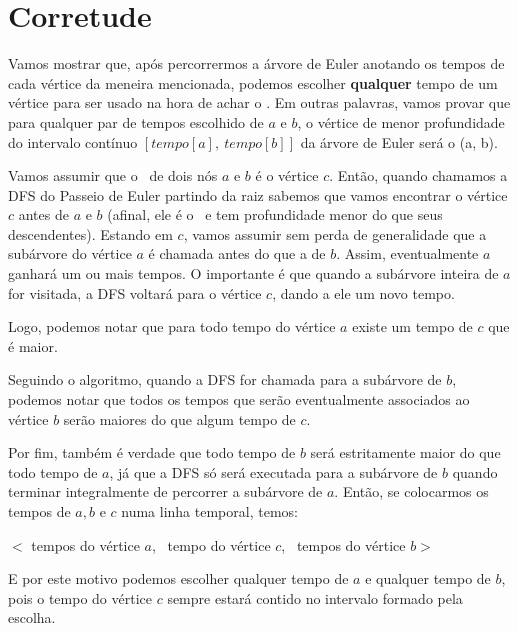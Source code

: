 \section{Corretude}

Vamos mostrar que, após percorrermos a árvore de Euler anotando os tempos de cada vértice da meneira mencionada, podemos escolher \textbf{qualquer} tempo de um vértice para ser usado na hora de achar o \LCA. Em outras palavras, vamos provar que para qualquer par de tempos escolhido de $a$ e $b$, o vértice de menor profundidade do intervalo contínuo $[tempo[a],\ tempo[b]]$ da árvore de Euler será o \LCA(a, b).

\vspace{0.5cm}

Vamos assumir que o \LCA\ de dois nós $a$ e $b$ é o vértice $c$. Então, quando chamamos a DFS do Passeio de Euler partindo da raiz sabemos que vamos encontrar o vértice $c$ antes de $a$ e $b$ (afinal, ele é o \LCA\ e tem profundidade menor do que seus descendentes). Estando em $c$, vamos assumir sem perda de generalidade que a subárvore do vértice $a$ é chamada antes do que a de $b$. Assim, eventualmente $a$ ganhará um ou mais tempos. O importante é que quando a subárvore inteira de $a$ for visitada, a DFS voltará para o vértice $c$, dando a ele um novo tempo.

Logo, podemos notar que para todo tempo do vértice $a$ existe um tempo de $c$ que é maior.

Seguindo o algoritmo, quando a DFS for chamada para a subárvore de $b$, podemos notar que todos os tempos que serão eventualmente associados ao vértice $b$ serão maiores do que algum tempo de $c$.

Por fim, também é verdade que todo tempo de $b$ será estritamente maior do que todo tempo de $a$, já que a DFS só será executada para a subárvore de $b$ quando terminar integralmente de percorrer a subárvore de $a$. Então, se colocarmos os tempos de $a, b$ e $c$ numa linha temporal, temos:

\begin{center}
    $<$ tempos do vértice $a$, \ tempo do vértice $c$, \ tempos do vértice  $b>$
\end{center}

E por este motivo podemos escolher qualquer tempo de $a$ e qualquer tempo de $b$, pois o tempo do vértice $c$ sempre estará contido no intervalo formado pela escolha.

\vspace{0.5cm}


